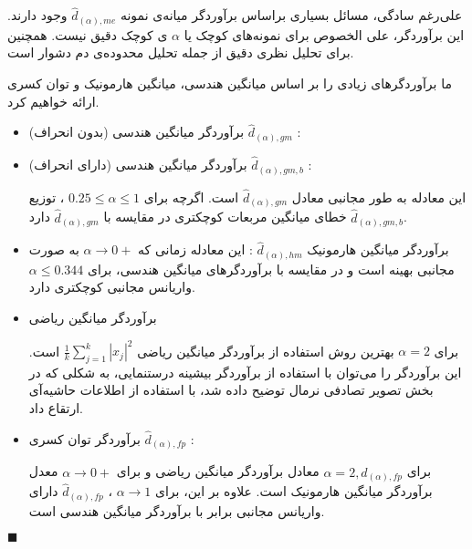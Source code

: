 علی‌رغم سادگی، مسائل بسیاری براساس برآوردگر میانه‌ی نمونه
$\hat{d}_{(\alpha), me}$
وجود دارند. این برآوردگر، علی الخصوص برای نمونه‌های کوچک یا 
$\alpha$
ی کوچک دقیق نیست. همچنین برای تحلیل نظری دقیق از جمله تحلیل محدوده‌ی دم دشوار است.

ما برآوردگرهای زیادی را بر اساس میانگین هندسی، میانگین هارمونیک و توان کسری ارائه خواهیم کرد.

\begin{itemize}
\item
برآوردگر میانگین هندسی (بدون انحراف) 
$\hat{d}_{(\alpha),gm}$
:
\item
برآوردگر میانگین هندسی (دارای انحراف) 
$\hat{d}_{(\alpha),gm,b}$
:

این معادله به طور مجانبی معادل
$\hat{d}_{(\alpha),gm}$
است. اگرچه برای 
$0.25 \leq \alpha \leq 1$
، توزیع
$\hat{d}_{(\alpha),gm,b}$
خطای میانگین مربعات کوچکتری در مقایسه با
$\hat{d}_{(\alpha),gm}$
دارد.
\item
برآوردگر میانگین هارمونیک 
$\hat{d}_{(\alpha),hm}$
:
این معادله زمانی که 
$\alpha \rightarrow 0+$
به صورت مجانبی بهینه است و در مقایسه با برآوردگرهای میانگین هندسی، برای 
$\alpha \leq 0.344$
واریانس مجانبی کوچکتری دارد.

\item
برآوردگر میانگین ریاضی

برای 
$\alpha = 2$
بهترین روش استفاده از برآوردگر میانگین ریاضی 
$\frac{1}{k} \sum_{j=1}^k \left| x_j \right|^2$
است. این برآوردگر را می‌توان با استفاده از برآوردگر بیشینه درستنمایی، به شکلی که در بخش تصویر تصادفی نرمال توضیح داده شد، با استفاده از اطلاعات حاشیه‌آی ارتقاع داد.
\item
برآوردگر توان کسری
$\hat{d}_{(\alpha),fp}$
:

برای 
$\alpha = 2, \hat{d}_{(\alpha), fp}$
معادل برآوردگر میانگین ریاضی و برای 
$\alpha \rightarrow 0+$
معدل برآوردگر میانگین هارمونیک است. علاوه بر این، برای 
$\alpha \rightarrow 1$
،
$\hat{d}_{(\alpha),fp}$
دارای واریانس مجانبی برابر با برآوردگر میانگین هندسی است.
\end{itemize}

$\blacksquare$
\bigskip























